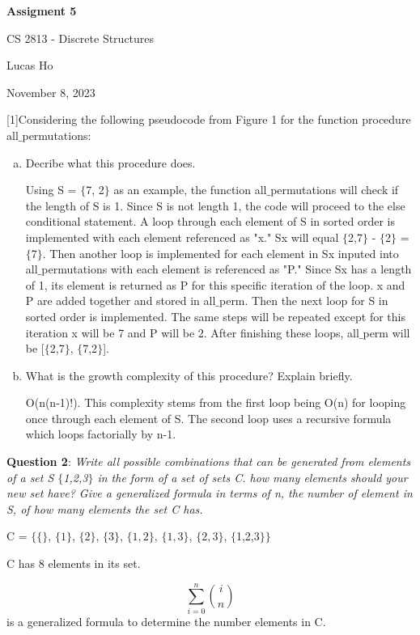 \documentclass{article} %
\newcommand{\question}[2][]{\begin{flushleft}
        \textbf{Question #1}: \textit{#2}

\end{flushleft}}
\newcommand{\maketitletwo}[2][]{\begin{center}
        \Large{\textbf{Assigment 5}
            
            CS 2813 - Discrete Structures} %
        \vspace{5pt}
        
        \normalsize{Lucas Ho  %
        
        November 8, 2023}        %
        \vspace{15pt}
        
\end{center}}
\begin{document}
    \maketitletwo[5]  %
    
    \question[1]{Considering the following pseudocode from Figure 1 for the function procedure all$\_$permutations:}

    \begin{enumerate}[(a)]
      \item {Decribe what this procedure does.}
      
      Using S = $\{$7, 2$\}$ as an example, the function all$\_$permutations will check if the length of S is 1. Since S is not length 1, the code will proceed to the else conditional statement. A loop through each element of S in sorted order is implemented with each element referenced as "x." Sx will equal $\{$2,7$\}$ - $\{$2$\}$ = $\{$7$\}$. Then another loop is implemented for each element in Sx inputed into all$\_$permutations with each element is referenced as "P." Since Sx has a length of 1, its element is returned as P for this specific iteration of the loop. x and P are added together and stored in all$\_$perm. Then the next loop for S in sorted order is implemented. The same steps will be repeated except for this iteration x will be 7 and P will be 2. After finishing these loops, all$\_$perm will be [$\{$2,7$\}$, $\{$7,2$\}$].
      \item {What is the growth complexity of this procedure? Explain briefly.}
      
      O(n(n-1)!). This complexity stems from the first loop being O(n) for looping once through each element of S. The second loop uses a recursive formula which loops factorially by n-1.
    \end{enumerate}

    \question[2]{Write all possible combinations that can be generated from elements of a set S $\{$1,2,3$\}$ in the form of a set of sets C. how many elements should your new set have? Give a generalized formula in terms of n, the number of element in S, of how many elements the set C has.}

    C = $\{$$\{\}$, $\{1\}$, $\{2\}$, $\{3\}$, $\{1,2\}$, $\{1,3\}$, $\{2,3\}$, $\{$1,2,3$\}$$\}$

    C has 8 elements in its set.

    \[ \sum_{i = 0}^{n} \binom{i}{n} \] is a generalized formula to determine the number elements in C.
\end{document}
